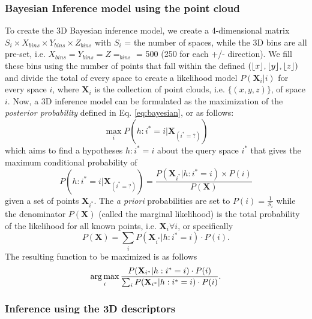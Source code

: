 \subsubsection{Bayesian Inference model using the point cloud}\label{subsubsec:bayesian}
To create the 3D Bayesian inference model, we create a 4-dimensional matrix $S_i\times X_{bins}\times Y_{bins}\times Z_{bins}$ with $S_i$ = the number of spaces, while the 3D bins are all pre-set, i.e. $X_{bins} = Y_{bins} = Z = _{bins}$ =  500 (250 for each +/- direction). We fill these bins using the number of points that fall within the defined $(\lfloor x\rfloor,\lfloor y\rfloor,\lfloor z\rfloor)$ and divide the total of every space to create a likelihood model $P(\textbf{X}_i | i)$ for every space $i$, where $\textbf{X}_i$ is the collection of point clouds, i.e. $\{(x,y,z)\}$, of space $i$. Now, a 3D inference model can be formulated as the maximization of the \textit{posterior probability} defined in Eq. \ref{eq:bayesian}, or as follows:
\begin{equation}
\max_{i}   P(h:i^*=i | {\textbf{X}_{(i^* = ?)}} )
\end{equation}
which aims to find a hypotheses $h:i^*=i$ about the query space $i^*$ that gives the maximum conditional probability of
\begin{equation}
P(h:i^*=i | {\textbf{X}_{(i^* = ?)}} ) =\frac{P(\textbf{X}_{i^*} | h: i^*=i) \times P(i)}{P(\textbf{X})}
\end{equation} given a set of points $\textbf{X}_{i^*}$.
The \textit{a priori} probabilities are set to $P(i) = \frac{1}{S_i}$ while the denominator $P(\textbf{X})$ (called the  marginal likelihood) is the total probability of the likelihood for all known  points, i.e. $\textbf{X}_i \forall i$, or specifically
\begin{equation}
P(\textbf{X}) =  \sum_{i} P(\textbf{X}_{i^*} | h: i^*=i) \cdot P(i).
\end{equation}
The resulting function to be maximized is as follows
\begin{equation}
\operatorname*{arg\,max}_{i} \frac{P(\textbf{X}_{i^*} | h: i^*=i) \cdot P(i)}{\sum_{i} P(\textbf{X}_{i^*} | h: i^*=i) \cdot P(i)}.
\end{equation}

\subsubsection{Inference using the 3D descriptors}\label{subsubsec:feature-matching}

